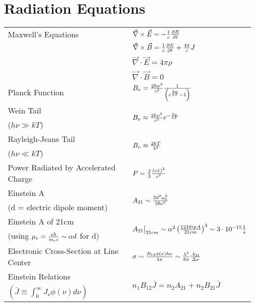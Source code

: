 \documentclass[10pt]{article}
\def\inv#1{{1\over #1}}
\def\ppt#1{{\partial #1 \over \partial t}}
\def\e#1{\cdot10^{#1}}
\begin{document}
\pagebreak
\section*{Radiation Equations}

\begin{table}[h!]\begin{tabular}{|l|l|}

\hline
Maxwell's Equations & 
$\vec\nabla \times \vec E=-\inv{c}\ppt{B}$ \\
& $\vec\nabla \times \vec B=\inv{c}\ppt{E} + {4\pi\over c} J$ \\
& $\vec\nabla \cdot\vec E=4\pi\rho$ \\
& $\vec\nabla \cdot\vec B=0$ \\

\hline
Planck Function &
$B_\nu={2h\nu^3\over c^2}\inv{\left(e^{h\nu\over kT}-1\right)}$ \\

Wein Tail & 
\multirow{2}{*}{$B_\nu\approx{2h\nu^3\over c^2}e^{-{h\nu\over kT}}$} \\
($h\nu\gg kT$) & \\

Rayleigh-Jeans Tail &
\multirow{2}{*}{$B_\nu\approx{2kT\over\lambda^2}$} \\
($h\nu\ll kT$) & \\

\hline
Power Radiated by Accelerated Charge &
$P=\frac23 {(e\ddot x)^2\over c^3}$ \\

\hline
Einstein A &
\multirow{2}{*}{$A_{21}\sim{2d^2\omega_0^3\over 3\hbar c^3}$} \\
(d = electric dipole moment) & \\

\hline
Einstein A of 21cm &
\multirow{2}{*}{$A_{21}\big|_{21cm}
\sim\alpha^2\left({1216\AA\over 21cm}\right)^3\sim3\e{-15} \inv{s}$} \\
(using $\mu_e={eh\over m_ec}\sim\alpha d$ for d) & \\

\hline
Electronic Cross-Section at Line Center &
$\sigma\sim{B_{12}\phi(\nu)h\nu\over 4\pi}\sim
{\lambda^2\over8\pi}{A_{21}\over\Delta\nu}$ \\

\hline
Einstein Relations &
\multirow{2}{*}{$n_1 B_{12}\bar J=n_2A_{21}+n_2B_{21}\bar J$} \\
$\left(\bar J\equiv\int_0^\infty{J_\nu\phi(\nu)d\nu}\right)$ & \\


\end{tabular}
\end{table}
\end{document}
